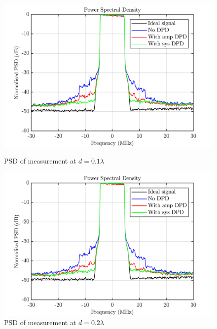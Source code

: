 \begin{figure}[H]
  \centering
  \begin{minipage}[b]{0.5\textwidth}
	\includegraphics[scale = 0.5]{figures/measurement/cree/meas3/psd_0p1.png}
	\caption{PSD of measurement at $d = 0.1\lambda$ }	
    \label{fig:meas3_psd1}
  \end{minipage}
  \hfill
  \begin{minipage}[b]{0.4\textwidth}
	\includegraphics[scale = 0.5]{figures/measurement/cree/meas3/psd_0p2.png}
	\caption{PSD of measurement at $d = 0.2\lambda$}
    \label{fig:meas3_psd2}
  \end{minipage}
\end{figure}

